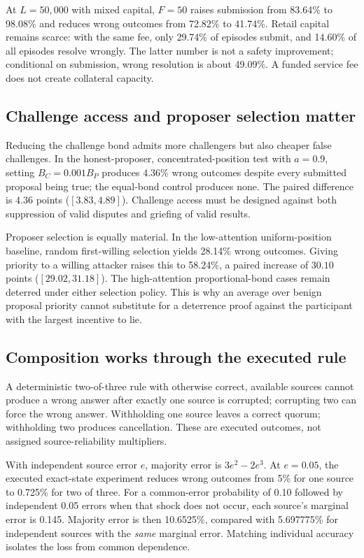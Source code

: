 \documentclass[10pt]{article}
\begin{document}
At $L=50{,}000$ with mixed capital, $F=50$ raises submission from 83.64\% to 98.08\% and reduces wrong outcomes from 72.82\% to 41.74\%. Retail capital remains scarce: with the same fee, only 29.74\% of episodes submit, and 14.60\% of all episodes resolve wrongly. The latter number is not a safety improvement; conditional on submission, wrong resolution is about 49.09\%. A funded service fee does not create collateral capacity.

\subsection{Challenge access and proposer selection matter}

Reducing the challenge bond admits more challengers but also cheaper false challenges. In the honest-proposer, concentrated-position test with $a=0.9$, setting $B_C=0.001B_P$ produces 4.36\% wrong outcomes despite every submitted proposal being true; the equal-bond control produces none. The paired difference is $4.36$ points ($[3.83,4.89]$). Challenge access must be designed against both suppression of valid disputes and griefing of valid results.

Proposer selection is equally material. In the low-attention uniform-position baseline, random first-willing selection yields 28.14\% wrong outcomes. Giving priority to a willing attacker raises this to 58.24\%, a paired increase of $30.10$ points ($[29.02,31.18]$). The high-attention proportional-bond cases remain deterred under either selection policy. This is why an average over benign proposal priority cannot substitute for a deterrence proof against the participant with the largest incentive to lie.

\subsection{Composition works through the executed rule}

A deterministic two-of-three rule with otherwise correct, available sources cannot produce a wrong answer after exactly one source is corrupted; corrupting two can force the wrong answer. Withholding one source leaves a correct quorum; withholding two produces cancellation. These are executed outcomes, not assigned source-reliability multipliers.

With independent source error $e$, majority error is $3e^2-2e^3$. At $e=0.05$, the executed exact-state experiment reduces wrong outcomes from 5\% for one source to 0.725\% for two of three. For a common-error probability of 0.10 followed by independent 0.05 errors when that shock does not occur, each source's marginal error is 0.145. Majority error is then 10.6525\%, compared with 5.697775\% for independent sources with the \emph{same} marginal error. Matching individual accuracy isolates the loss from common dependence.
\end{document}
